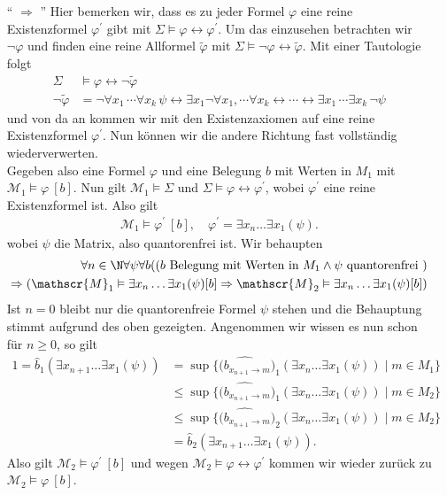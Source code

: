 \begin{solution}
\begin{enumerate}
		\item[`` $\Rightarrow$ ''] Hier bemerken wir, dass es zu jeder Formel $\varphi$ eine reine Existenzformel $\varphi^\prime$ gibt mit $\Sigma \vDash \varphi \leftrightarrow \varphi^\prime$. Um das einzusehen betrachten wir $\neg \varphi$ und finden eine reine Allformel $\tilde{\varphi}$ mit $\Sigma \vDash \neg \varphi \leftrightarrow \tilde{\varphi}$. Mit einer Tautologie folgt
		\begin{align*}
		\Sigma &\vDash \varphi \leftrightarrow \neg \tilde{\varphi} \\
    \neg \tilde{\varphi} &= \neg \forall x_1\,\cdots\forall x_k\,\psi \leftrightarrow
    \exists x_1 \neg \forall x_1,\cdots \forall x_k \leftrightarrow \cdots \leftrightarrow \exists x_1\, \cdots \exists x_k\, \neg \psi
		\end{align*}
		und von da an kommen wir mit den Existenzaxiomen auf eine reine Existenzformel $\varphi^\prime$. Nun können wir die andere Richtung fast vollständig wiederverwerten.\\
		Gegeben also eine Formel $\varphi$ und eine Belegung $b$ mit Werten in $M_1$ mit $\mathscr{M}_1 \vDash \varphi \ [b]$. Nun gilt $\mathscr{M}_1 \vDash \Sigma$ und $\Sigma \vDash \varphi \leftrightarrow \varphi^\prime$, wobei $\varphi^\prime$ eine reine Existenzformel ist. Also gilt
		\begin{align*}
		\mathscr{M}_1 \vDash \varphi^\prime \ [b], \quad \varphi^\prime = \exists x_n \dots \exists x_1(\psi).
		\end{align*}
		wobei $\psi$ die Matrix, also quantorenfrei ist. Wir behaupten
		\begin{align*}
		\forall n \in \N \forall \psi \forall b ((b \text{ Belegung mit Werten in } M_1 \land \psi \text{ quantorenfrei }) \\
		\Rightarrow (\mathscr{M}_1 \vDash \exists x_n \dots \exists x_1 (\psi)[b] \Rightarrow \mathscr{M}_2 \vDash \exists x_n \dots \exists x_1 (\psi)[b])
		\end{align*}
		Ist $n = 0$ bleibt nur die quantorenfreie Formel $\psi$ stehen und die Behauptung stimmt aufgrund des oben gezeigten. Angenommen wir wissen es nun schon für $n \geq 0$, so gilt
		\begin{align*}
		1 = \widehat{b}_1(\exists x_{n + 1} \dots \exists x_1 (\psi)) &= \sup\{\widehat{(b_{x_{n + 1} \to m}})_1(\exists x_n \dots \exists x_1(\psi)) \mid m \in M_1\} \\
		&\leq \sup\{\widehat{(b_{x_{n + 1} \to m}})_1(\exists x_n \dots \exists x_1(\psi)) \mid m \in M_2\} \\
		&\leq \sup\{\widehat{(b_{x_{n + 1} \to m}})_2(\exists x_n \dots \exists x_1(\psi)) \mid m \in M_2\} \\
		&= \widehat{b}_2(\exists x_{n + 1} \dots \exists x_1 (\psi)).
		\end{align*}
		Also gilt $\mathscr{M}_2 \vDash \varphi^\prime \ [b]$ und wegen
    $\mathscr{M}_2 \vDash \varphi \leftrightarrow \varphi^{\prime}$
    kommen wir wieder zurück zu $\mathscr{M}_2 \vDash \varphi \ [b]$.
	\end{enumerate}
\end{solution}

